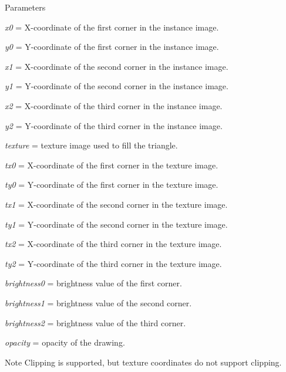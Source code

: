 \begin{DoxyParams}{Parameters}
\item[{\em x0}]= X-\/coordinate of the first corner in the instance image. \item[{\em y0}]= Y-\/coordinate of the first corner in the instance image. \item[{\em x1}]= X-\/coordinate of the second corner in the instance image. \item[{\em y1}]= Y-\/coordinate of the second corner in the instance image. \item[{\em x2}]= X-\/coordinate of the third corner in the instance image. \item[{\em y2}]= Y-\/coordinate of the third corner in the instance image. \item[{\em texture}]= texture image used to fill the triangle. \item[{\em tx0}]= X-\/coordinate of the first corner in the texture image. \item[{\em ty0}]= Y-\/coordinate of the first corner in the texture image. \item[{\em tx1}]= X-\/coordinate of the second corner in the texture image. \item[{\em ty1}]= Y-\/coordinate of the second corner in the texture image. \item[{\em tx2}]= X-\/coordinate of the third corner in the texture image. \item[{\em ty2}]= Y-\/coordinate of the third corner in the texture image. \item[{\em brightness0}]= brightness value of the first corner. \item[{\em brightness1}]= brightness value of the second corner. \item[{\em brightness2}]= brightness value of the third corner. \item[{\em opacity}]= opacity of the drawing. \end{DoxyParams}
\begin{DoxyNote}{Note}
Clipping is supported, but texture coordinates do not support clipping. 
\end{DoxyNote}
